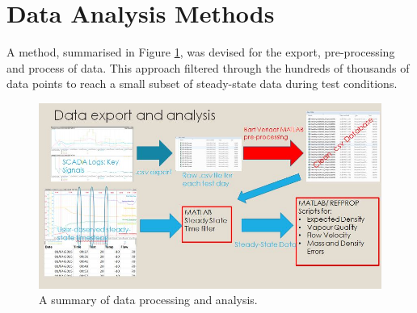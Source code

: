 \documentclass{report}
\begin{document}
\section{Data Analysis Methods}
A method, summarised in Figure \ref{fig:processing}, was devised for the export, pre-processing and process of data. This approach filtered through the hundreds of thousands of data points to reach a small subset of steady-state data during test conditions. 

\begin{figure}
\includegraphics[width=\textwidth]{processing}
\caption{A summary of data processing and analysis.}
\label{fig:processing}
\end{figure}
\end{document}
